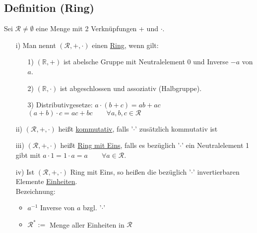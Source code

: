 \documentclass[12pt,titlepage, pdf]{article}
\newcommand{\R}{\mathds{R}}
\newcommand{\uline}[1]{\underline{#1}}
\renewcommand{\>}{\rightarrow}
\renewcommand{\*}{\cdot}
\begin{document}
\subsection{Definition (Ring)}
Sei $\mathcal{R} \neq \emptyset$ eine Menge mit 2 Verknüpfungen + und $\cdot$.
\begin{itemize}
	\item[i)] Man nennt $(\mathcal{R}, + , \cdot)$ einen \uline{Ring}, wenn gilt: 
	\begin{itemize}
		\item[1)] $(\R, + )$ ist abelsche Gruppe mit Neutralelement 0 und Inverse $-a$ von $a$.
		\item[2)] $(\R, \cdot)$ ist abgeschlossen und assoziativ (Halbgruppe).
		\item[3)] Distributivgesetze: $a \cdot (b+c) = ab + ac$\\
		\noindent\hspace*{32.5mm}$ (a+b) \cdot c = ac + bc \qquad \forall a,b,c \in \mathcal{R}$
	\end{itemize}
		\item[ii)] $(\mathcal{R},+,\cdot)$ heißt \uline{kommutativ}, falls '$\cdot$' zusätzlich kommutativ ist
		\item[iii)] $(\mathcal{R},+,\cdot)$ heißt \uline{Ring mit Eins}, falls es bezüglich '$\cdot$' ein Neutralelement 1 gibt mit $a \cdot 1 = 1 \cdot a = a \qquad \forall a \in \mathcal{R}$.
		\item[iv)] Ist $(\mathcal{R},+,\cdot)$ Ring mit Eins, so heißen die bezüglich '$\cdot$' invertierbaren Elemente \uline{Einheiten}. \\
		Bezeichnung: 
		\begin{itemize}
			\item $a^{-1}$ Inverse von $a$ bzgl. '$\cdot$' \item $\mathcal{R}^* :=$ Menge aller Einheiten in $\mathcal{R}$
		\end{itemize}
	\end{itemize}
\end{document}
